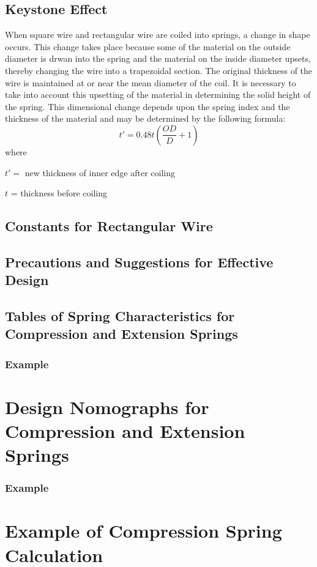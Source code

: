 \documentclass[10pt]{article}
\begin{document}
\subsection{Keystone Effect}
When square wire and rectangular wire are coiled into springs, a change in shape occurs. 
This change takes place because some of the material on the outside diameter is drwan into the spring and the material on the inside diameter upsets, thereby changing the wire into a trapezoidal section. 
The original thickness of the wire is maintained at or near the mean diameter of the coil.
It is necessary to take into account this upsetting of the material in determining the solid height of the spring. 
This dimensional change depends upon the spring index and the thickness of the material and may be determined by the following formula:
$$ t' = 0.48t \left( \frac{OD}{D} + 1 \right) $$
where

$t' = $ new thickness of inner edge after coiling

$t$ = thickness before coiling

\subsection{Constants for Rectangular Wire}
\subsection{Precautions and Suggestions for Effective Design}
\subsection{Tables of Spring Characteristics for Compression and Extension Springs}
\subsubsection{Example}

\section{Design Nomographs for Compression and Extension Springs}
\subsubsection{Example}

\section{Example of Compression Spring Calculation}
\end{document}

